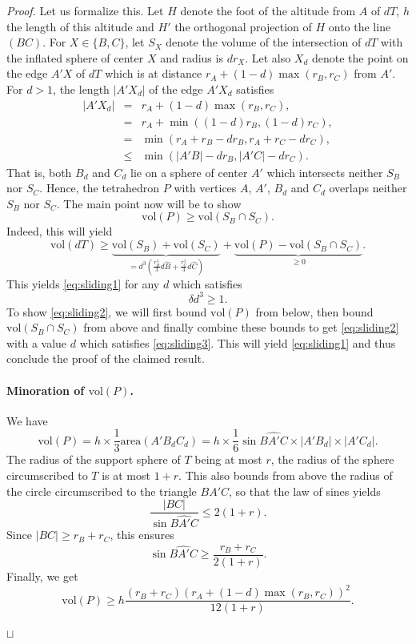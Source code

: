 \documentclass[11pt]{article}
\newenvironment{proof}{\noindent \emph{Proof. }}{\hfill \hbox{\rlap{$\sqcap$}$\sqcup$}\\}
\begin{document}
\begin{proof}
Let us formalize this.
Let $H$ denote the foot of the altitude from $A$ of $dT$, $h$ the length of this altitude and $H'$ the orthogonal projection of $H$ onto the line $(BC)$.
For $X\in\{B,C\}$, let $S_X$ denote the volume of the intersection of $dT$ with the inflated sphere of center $X$ and radius is $dr_X$.
Let also $X_d$ denote the point on the edge $A'X$ of $dT$ which is at distance $r_A+(1-d)\max(r_B,r_C)$ from $A'$.
For $d>1$, the length $|A'X_d|$ of the edge $A'X_d$ satisfies
\begin{eqnarray*}
|A'X_d|
&=&r_A+(1-d)\max(r_B,r_C),\\
&=&r_A+\min((1-d)r_B,(1-d)r_C),\\
&=&\min(r_A+r_B-dr_B,r_A+r_C-dr_C),\\
&\leq&\min(|A'B|-dr_B,|A'C|-dr_C).
\end{eqnarray*}
That is, both $B_d$ and $C_d$ lie on a sphere of center $A'$ which intersects neither $S_B$ nor $S_C$.
Hence, the tetrahedron $P$ with vertices $A$, $A'$, $B_d$ and $C_d$ overlaps neither $S_B$ nor $S_C$.
The main point now will be to show
\begin{equation}
\label{eq:sliding2}
\textrm{vol}(P)\geq \textrm{vol}(S_B\cap S_C).
\end{equation}
Indeed, this will yield
\[
\textrm{vol}(dT) \geq 
\underbrace{\textrm{vol}(S_B)+\textrm{vol}(S_C)}_{=d^3\left(\frac{r_B^3}{3}d\widehat{B}+\frac{r_C^3}{3}d\widehat{C}\right)}+\underbrace{\textrm{vol}(P)-\textrm{vol}(S_B\cap S_C)}_{\geq 0}.
\]
This yields \eqref{eq:sliding1} for any $d$ which satisfies
\begin{equation}
\label{eq:sliding3}
\delta d^3\geq 1.
\end{equation}
To show \eqref{eq:sliding2}, we will first bound $\textrm{vol}(P)$ from below, then bound $\textrm{vol}(S_B\cap S_C)$ from above and finally combine these bounds to get \eqref{eq:sliding2} with a value $d$ which satisfies \eqref{eq:sliding3}.
This will yield \eqref{eq:sliding1} and thus conclude the proof of the claimed result.

\paragraph{Minoration of $\textrm{vol}(P)$.}
We have
\[
\textrm{vol}(P)=h\times\frac{1}{3}\textrm{area}(A'B_dC_d)=h\times \frac{1}{6}\sin\widehat{BA'C}\times |A'B_d|\times |A'C_d|.
\]
The radius of the support sphere of $T$ being at most $r$, the radius of the sphere circumscribed to $T$ is at most $1+r$.
This also bounds from above the radius of the circle circumscribed to the triangle $BA'C$, so that the law of sines yields
\[
\frac{|BC|}{\sin\widehat{BA'C}}\leq 2(1+r).
\]
Since $|BC|\geq r_B+r_C$, this ensures
\[
\sin\widehat{BA'C}\geq \frac{r_B+r_C}{2(1+r)}.
\]
Finally, we get
\begin{equation}
\label{eq:sliding4}
\textrm{vol}(P)\geq h\frac{(r_B+r_C)(r_A+(1-d)\max(r_B,r_C))^2}{12(1+r)}.
\end{equation}


\end{proof}
\end{document}
